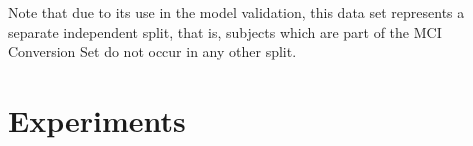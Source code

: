 Note that due to its use in the model validation, this data set represents a separate independent split, that is, subjects which are part of the MCI Conversion Set do not occur in any other split.

\chapter{Experiments}

